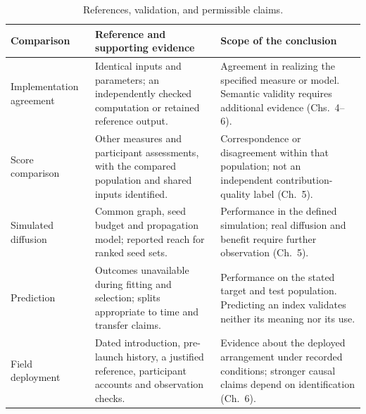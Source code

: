 \begin{table}[tbp]
\caption{References, validation, and permissible claims.}
\label{tab:ch3-validation}
\begingroup\fontsize{9.2}{11.8}\selectfont
\renewcommand{\arraystretch}{1.12}
\begin{tabularx}{\textwidth}{@{}>{\raggedright\arraybackslash}p{25mm}>{\raggedright\arraybackslash}X >{\raggedright\arraybackslash}X@{}}
\toprule
\textbf{Comparison} & \textbf{Reference and supporting evidence} & \textbf{Scope of the conclusion}\\
\midrule
Implementation agreement & Identical inputs and parameters; an independently checked computation or retained reference output. & Agreement in realizing the specified measure or model. Semantic validity requires additional evidence (Chs.~4--6).\\[5pt]
Score comparison & Other measures and participant assessments, with the compared population and shared inputs identified. & Correspondence or disagreement within that population; not an independent contribution-quality label (Ch.~5).\\[5pt]
Simulated diffusion & Common graph, seed budget and propagation model; reported reach for ranked seed sets. & Performance in the defined simulation; real diffusion and benefit require further observation (Ch.~5).\\[5pt]
Prediction & Outcomes unavailable during fitting and selection; splits appropriate to time and transfer claims. & Performance on the stated target and test population. Predicting an index validates neither its meaning nor its use.\\[5pt]
Field deployment & Dated introduction, pre-launch history, a justified reference, participant accounts and observation checks. & Evidence about the deployed arrangement under recorded conditions; stronger causal claims depend on identification (Ch.~6).\\
\bottomrule
\end{tabularx}
\endgroup
{}
\end{table}
